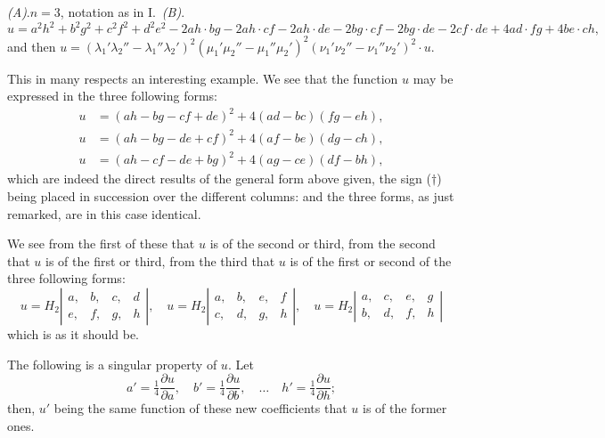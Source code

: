 \documentclass[11pt,a4paper]{article}
\theoremstyle{plain}
\theoremstyle{definition}
\theoremstyle{remark}
\begin{document}
\textit{(A)}.\quad $n=3$, notation as in I.\ \textit{(B)}.
\[
u = a^2h^2 + b^2g^2 + c^2f^2 + d^2e^2 - 2ah \cdot bg - 2ah \cdot cf - 2ah \cdot de - 2bg \cdot cf - 2bg \cdot de - 2cf \cdot de + 4ad \cdot fg + 4be \cdot ch,
\]
and then $u = (\lambda_1'\lambda_2'' - \lambda_1''\lambda_2')^2 (\mu_1'\mu_2'' - \mu_1''\mu_2')^2 (\nu_1'\nu_2'' - \nu_1''\nu_2')^2 \cdot u$.

This in many respects an interesting example. We see that the function $u$
may be expressed in the three following forms:
\begin{align*}
u &= (ah - bg - cf + de)^2 + 4(ad - bc)(fg - eh) \tag{1}, \\
u &= (ah - bg - de + cf)^2 + 4(af - be)(dg - ch) \tag{2}, \\
u &= (ah - cf - de + bg)^2 + 4(ag - ce)(df - bh) \tag{3},
\end{align*}
which are indeed the direct results of the general form above given, the sign ($\dagger$)
being placed in succession over the different columns: and the three forms, as just
remarked, are in this case identical.

We see from the first of these that $u$ is of the second or third, from the second
that $u$ is of the first or third, from the third that $u$ is of the first or second of the
three following forms:
\[
u = H_2
\left|\begin{array}{cccc}
a, & b, & c, & d \\
e, & f, & g, & h
\end{array}\right|,
\quad
u = H_2
\left|\begin{array}{cccc}
a, & b, & e, & f \\
c, & d, & g, & h
\end{array}\right|,
\quad
u = H_2
\left|\begin{array}{cccc}
a, & c, & e, & g \\
b, & d, & f, & h
\end{array}\right|
\]
which is as it should be.

The following is a singular property of $u$. Let
\[
a' = \tfrac{1}{4}\frac{\partial u}{\partial a}, \quad b' = \tfrac{1}{4}\frac{\partial u}{\partial b}, \quad \ldots \quad h' = \tfrac{1}{4}\frac{\partial u}{\partial h};
\]
then, $u'$ being the same function of these new coefficients that $u$ is of the former ones.
\end{document}
